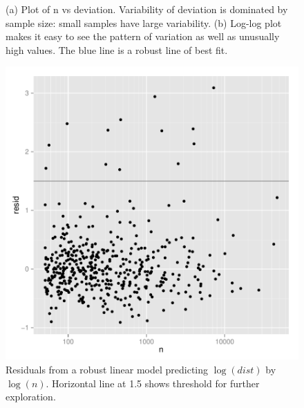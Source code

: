 \documentclass[article]{jss}
\begin{document}
\begin{figure}[htbp]
  \centering

  \caption{(a) Plot of n vs deviation. Variability of deviation is dominated by sample size: small samples have large variability. (b) Log-log plot makes it easy to see the pattern of variation as well as unusually high values.  The blue line is a robust line of best fit.}
  \label{fig:deviation}
\end{figure}

\begin{figure}[htbp]
  \centering
  \includegraphics[width=0.5\linewidth]{case-study/n-dist-resid}
  \caption{Residuals from a robust linear model predicting $\log(dist)$ by $\log(n)$. Horizontal line at 1.5 shows threshold for further exploration.}
  \label{fig:devi-resid}
\end{figure}
\end{document}
